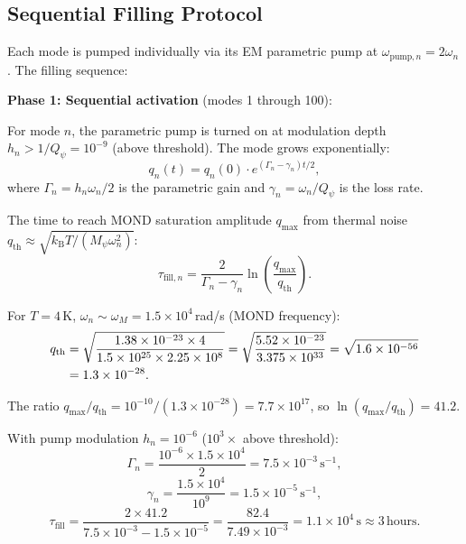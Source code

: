 \documentclass[11pt]{article}
\theoremstyle{definition}
\theoremstyle{remark}
\newcommand{\kB}{k_{\mathrm{B}}}
\newcommand{\Qpsi}{Q_\psi}
\newcommand{\Mpsi}{M_\psi}
\begin{document}
\subsection{Sequential Filling Protocol}

Each mode is pumped individually via its EM parametric pump at
$\omega_{\mathrm{pump},n} = 2\omega_n$. The filling sequence:

\textbf{Phase 1: Sequential activation} (modes 1 through 100):

For mode $n$, the parametric pump is turned on at modulation depth
$h_n > 1/\Qpsi = 10^{-9}$ (above threshold). The mode grows
exponentially:
\begin{equation}
q_n(t) = q_n(0) \cdot e^{(\Gamma_n - \gamma_n)t/2},
\end{equation}
where $\Gamma_n = h_n \omega_n / 2$ is the parametric gain and
$\gamma_n = \omega_n / \Qpsi$ is the loss rate.

The time to reach MOND saturation amplitude $q_{\max}$ from thermal
noise $q_{\mathrm{th}} \approx \sqrt{\kB T / (\Mpsi \omega_n^2)}$:
\begin{equation}
\tau_{\mathrm{fill},n} = \frac{2}{\Gamma_n - \gamma_n}
\ln\!\left(\frac{q_{\max}}{q_{\mathrm{th}}}\right).
\end{equation}

For $T = 4$\,K, $\omega_n \sim \omega_M = 1.5 \times 10^4$\,rad/s
(MOND frequency):
\begin{align}
q_{\mathrm{th}} &= \sqrt{\frac{1.38 \times 10^{-23} \times 4}
{1.5 \times 10^{25} \times 2.25 \times 10^8}}
= \sqrt{\frac{5.52 \times 10^{-23}}{3.375 \times 10^{33}}}
= \sqrt{1.6 \times 10^{-56}} \notag \\
&= 1.3 \times 10^{-28}.
\end{align}

The ratio $q_{\max}/q_{\mathrm{th}} = 10^{-10}/(1.3 \times 10^{-28})
= 7.7 \times 10^{17}$, so
$\ln(q_{\max}/q_{\mathrm{th}}) = 41.2$.

With pump modulation $h_n = 10^{-6}$ ($10^3\times$ above threshold):
\begin{equation}
\Gamma_n = \frac{10^{-6} \times 1.5 \times 10^4}{2} = 7.5 \times 10^{-3}\,\mathrm{s}^{-1},
\end{equation}
\begin{equation}
\gamma_n = \frac{1.5 \times 10^4}{10^9} = 1.5 \times 10^{-5}\,\mathrm{s}^{-1},
\end{equation}
\begin{equation}
\tau_{\mathrm{fill}} = \frac{2 \times 41.2}{7.5 \times 10^{-3} - 1.5 \times 10^{-5}}
= \frac{82.4}{7.49 \times 10^{-3}} = 1.1 \times 10^4\,\mathrm{s}
\approx 3\,\mathrm{hours}.
\end{equation}
\end{document}
